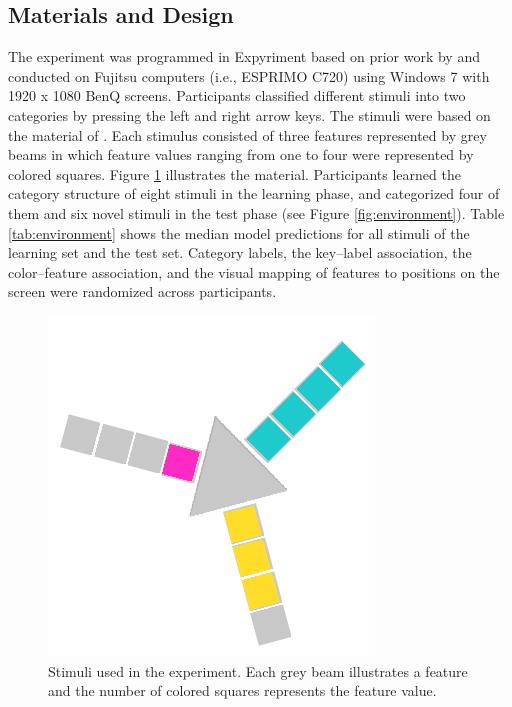 \documentclass[a4paper,man,natbib]{apa6}
\begin{document}
\subsection{Materials and Design}
The experiment was programmed in Expyriment \citep{krause2014expyriment} based on prior work by \cite{albrechtxxxunstacking} and conducted on Fujitsu computers (i.e., ESPRIMO C720) using Windows 7 with 1920 x 1080 BenQ screens. Participants classified different stimuli into two categories by pressing the left and right arrow keys. The stimuli were based on the material of \cite{albrechtxxxunstacking}. Each stimulus consisted of three features represented by grey beams in which feature values ranging from one to four were represented by colored squares. Figure \ref{fig:material} illustrates the material. Participants learned the category structure of eight stimuli in the learning phase, and categorized four of them and six novel stimuli in the test phase (see Figure \ref{fig:environment}). Table \ref{tab:environment} shows the median model predictions for all stimuli of the learning set and the test set. Category labels, the key--label association, the color--feature association, and the visual mapping of features to positions on the screen were randomized across participants.

\begin{figure}
\centering
\includegraphics{fig_material.PNG}
\caption{Stimuli used in the experiment. Each grey beam illustrates a feature and the number of colored squares represents the feature value.}
\label{fig:material}
\end{figure}
\end{document}
